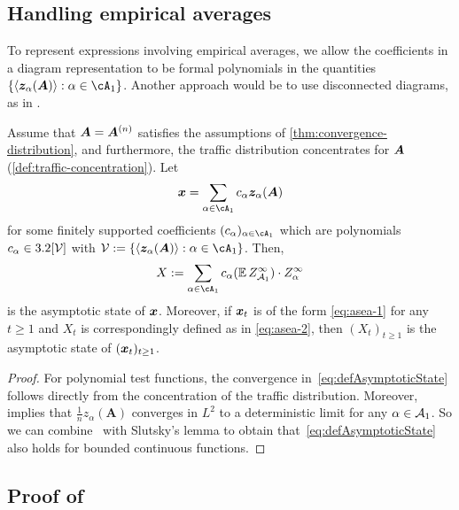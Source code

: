 \subsection{Handling empirical averages}
\label{sec:empirical-averages}

To represent expressions involving empirical averages,
we allow the coefficients in a diagram representation
to be formal polynomials in the quantities 
$\{\langle \bmz_\al(\bA)\rangle : \al \in \cA_1\}$.
Another approach would be to use disconnected diagrams, as in \cite{jones2025fourier}.

\begin{lemma}\label{lem:asymptotic-state-empirical-average}
    Assume that ${\bm A} = {\bm A}^{(n)}$ satisfies the assumptions of \cref{thm:convergence-distribution},
    and furthermore, the traffic distribution concentrates for ${\bm A}$ (\cref{def:traffic-concentration}).
    Let
    \begin{equation}\label{eq:asea-1}
        \bmx = \sum_{\al \in \cA_1} c_\al \bmz_\al(\bA)
    \end{equation}
    for some finitely supported coefficients $(c_\al)_{\al \in \cA_1}$ which are polynomials $c_\alpha \in 3.2[{\cal V}]$ with $\calV := \{\langle{\bmz_\al(\bA)}\rangle : \al \in \cA_1\}$. Then,
    \begin{equation}\label{eq:asea-2}
        X := \sum_{\al \in \cA_1} c_\al(\E Z^\infty_{\calA_1}) \cdot Z_\al^\infty
    \end{equation}
    is the asymptotic state of ${\bm x}$.
    Moreover, if ${\bm x}_t$ is of the form \cref{eq:asea-1} for any $t \geq 1$ and $X_t$ is correspondingly defined as in \cref{eq:asea-2}, then $(X_t)_{t \geq 1}$ is the asymptotic state of $({\bm x}_t)_{t \geq 1}$.
\end{lemma}
\begin{proof}
    For polynomial test functions, the convergence in~\cref{eq:defAsymptoticState} follows
    directly from the concentration of the traffic distribution.
    Moreover,~ implies that $\frac 1n z_{\alpha}(\bm A)$ converges 
    in $L^2$ to a deterministic limit for any $\alpha\in {\cal A}_1$. So we can
    combine~ with
    Slutsky's lemma to obtain that~\cref{eq:defAsymptoticState} also holds
    for bounded continuous functions.
\end{proof}


\subsection{\texorpdfstring{Proof of~}{Proof of the puncturing lemma}}
\label{appendix:initialization}


